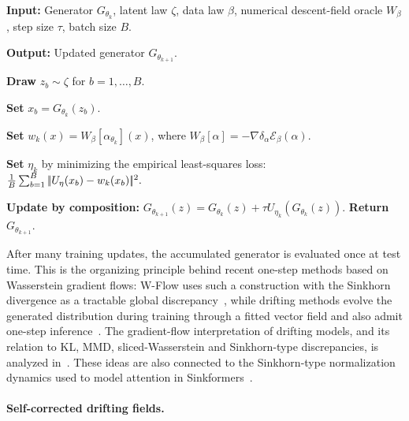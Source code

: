 \begin{alg}\label{alg:one-step-wgf-generator-update}
\textbf{Input:} Generator $G_{\theta_k}$, latent law $\zeta$, data law $\beta$, numerical descent-field oracle $W_\beta$, step size $\tau$, batch size $B$.

\textbf{Output:} Updated generator $G_{\theta_{k+1}}$.

\textbf{Draw} $z_b\sim\zeta$ for $b=1,\ldots,B$.

\textbf{Set} $x_b=G_{\theta_k}(z_b)$.

\textbf{Set} \(w_k(x)=W_\beta[\alpha_{\theta_k}](x)\), where \(W_\beta[\alpha]=-\nabla\delta_\alpha\mathcal E_\beta(\alpha)\).

\textbf{Set} $\eta_k$ by minimizing the empirical least-squares loss:
\(\frac1B\sum_{b=1}^B |\!| U_{\eta}(x_b)-w_k(x_b) |\!|^2.\)

\textbf{Update by composition:}
\(G_{\theta_{k+1}}(z) = G_{\theta_k}(z)+\tau U_{\eta_k}(G_{\theta_k}(z)).\)
\textbf{Return} $G_{\theta_{k+1}}$.
\end{alg}

After many training updates, the accumulated generator is evaluated once at test time. This is the organizing principle behind recent one-step methods based on Wasserstein gradient flows: W-Flow uses such a construction with the Sinkhorn divergence as a tractable global discrepancy~\cite{Han2026WFlow}, while drifting methods evolve the generated distribution during training through a fitted vector field and also admit one-step inference~\cite{Deng2026Drifting}. The gradient-flow interpretation of drifting models, and its relation to KL, MMD, sliced-Wasserstein and Sinkhorn-type discrepancies, is analyzed in~\cite{Gretton2026DriftingWGF,He2026SinkhornDrifting}. These ideas are also connected to the Sinkhorn-type normalization dynamics used to model attention in Sinkformers~\cite{Sander2022Sinkformers}.

\paragraph{Self-corrected drifting fields.}

